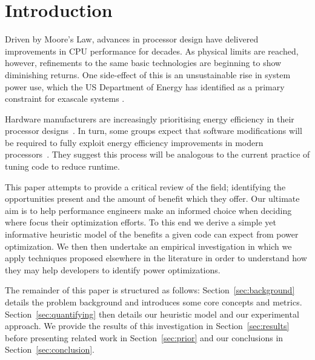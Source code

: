 \section*{Introduction \golden}
Driven by Moore's Law, advances in processor design have delivered improvements in CPU performance for decades. As physical limits are reached, however, refinements to the same basic technologies are beginning to show diminishing returns. One side-effect of this is an unsustainable rise in system power use, which the US Department of Energy has identified as a primary constraint for exascale systems \cite{shalf:2011aa}. \golden

Hardware manufacturers are increasingly prioritising energy efficiency in their processor designs~\cite{kurd:2014aa}. In turn, some groups expect that software modifications will be required to fully exploit energy efficiency improvements in modern processors~\cite{shao:2013aa}. They suggest this process will be analogous to the current practice of tuning code to reduce runtime.



This paper attempts to provide a critical review of the field; identifying the opportunities present and the amount of benefit which they offer. Our ultimate aim is to help performance engineers make an informed choice when deciding where focus their optimization efforts. To this end we derive a simple yet informative heuristic model of the benefits a given code can expect from power optimization. We then then undertake an empirical investigation in which we apply techniques proposed elsewhere in the literature in order to understand how they may help developers to identify power optimizations.
 \golden

The remainder of this paper is structured as follows: Section~\ref{sec:background} details the problem background and introduces some core concepts and metrics. Section~\ref{sec:quantifying} then details our heuristic model and our experimental approach. We provide the results of this investigation in Section~\ref{sec:results} before presenting related work in Section~\ref{sec:prior} and our conclusions in Section~\ref{sec:conclusion}. \golden


